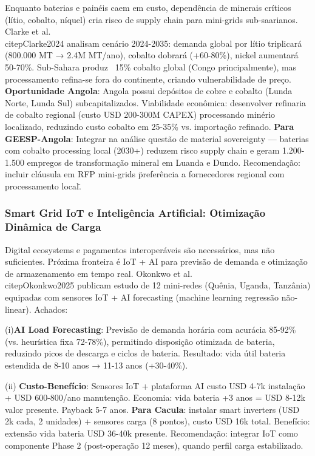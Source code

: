 \documentclass[12pt, a4paper]{article}
\begin{document}
Enquanto baterias e painéis caem em custo, dependência de minerais críticos (lítio, cobalto, níquel) cria risco de supply chain para mini-grids sub-saarianos. Clarke et al.~\\citep{Clarke2024} analisam cenário 2024-2035: demanda global por lítio triplicará (800.000 MT → 2.4M MT/ano), cobalto dobrará (+60-80\%), nickel aumentará 50-70\%. Sub-Sahara produz ~15\% cobalto global (Congo principalmente), mas processamento refina-se fora do continente, criando vulnerabilidade de preço.
\textbf{Oportunidade Angola}: Angola possui depósitos de cobre e cobalto (Lunda Norte, Lunda Sul) subcapitalizados. Viabilidade econômica: desenvolver refinaria de cobalto regional (custo USD 200-300M CAPEX) processando minério localizado, reduzindo custo cobalto em 25-35\% vs. importação refinado.
\textbf{Para GEESP-Angola}: Integrar na análise questão de material sovereignty — baterias com cobalto processing local (2030+) reduzem risco supply chain e geram 1.200-1.500 empregos de transformação mineral em Luanda e Dundo. Recomendação: incluir cláusula em RFP mini-grids \"preferência a fornecedores regional com processamento local\".

\subsubsection{Smart Grid IoT e Inteligência Artificial: Otimização Dinâmica de Carga}

Digital ecosystems e pagamentos interoperáveis são necessários, mas não suficientes. Próxima fronteira é IoT + AI para previsão de demanda e otimização de armazenamento em tempo real. Okonkwo et al.~\\citep{Okonkwo2025} publicam estudo de 12 mini-redes (Quênia, Uganda, Tanzânia) equipadas com sensores IoT + AI forecasting (machine learning regressão não-linear). Achados: 

(i)\textbf{AI Load Forecasting}: Previsão de demanda horária com acurácia 85-92\% (vs. heurística fixa 72-78\%), permitindo disposição otimizada de bateria, reduzindo picos de descarga e ciclos de bateria. Resultado: vida útil bateria estendida de 8-10 anos → 11-13 anos (+30-40\%).

(ii)
\textbf{Custo-Benefício}: Sensores IoT + plataforma AI custo USD 4-7k instalação + USD 600-800/ano manutenção. Economia: vida bateria +3 anos = USD 8-12k valor presente. Payback 5-7 anos.
\textbf{Para Cacula}: instalar smart inverters (USD 2k cada, 2 unidades) + sensores carga (8 pontos), custo USD 16k total. Benefício: extensão vida bateria USD 36-40k presente. Recomendação: integrar IoT como componente Phase 2 (post-operação 12 meses), quando perfil carga estabilizado.
\end{document}
